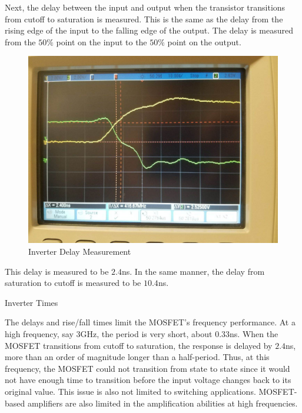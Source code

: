 Next, the delay between the input and output when the transistor transitions from cutoff to saturation is measured. This is the same as the delay from the rising edge of the input to the falling edge of the output. The delay is measured from the $50\%$ point on the input to the $50\%$ point on the output.

\FloatBarrier
\begin{figure}[h!]
	\centering
	\includegraphics[scale=0.25]{../images/inverter_input_rising_td.jpeg}
	\caption{Inverter Delay Measurement}
	\label{fig:inverter_time_delay}
\end{figure}
\FloatBarrier

This delay is measured to be $2.4$\si{\nano\second}. In the same manner, the delay from saturation to cutoff is measured to be $10.4$\si{\nano\second}.

\FloatBarrier
\begin{table}[h!]
	\centering
	\caption{Inverter Times}
	\label{tab:inverter_times}
\end{table}
\FloatBarrier

The delays and rise/fall times limit the MOSFET's frequency performance. At a high frequency, say $3$\si{\giga\hertz}, the period is very short, about $0.33$\si{\nano\second}. When the MOSFET transitions from cutoff to saturation, the response is delayed by $2.4$\si{\nano\second}, more than an order of magnitude longer than a half-period. Thus, at this frequency, the MOSFET could not transition from state to state since it would not have enough time to transition before the input voltage changes back to its original value. This issue is also not limited to switching applications. MOSFET-based amplifiers are also limited in the amplification abilities at high frequencies.
